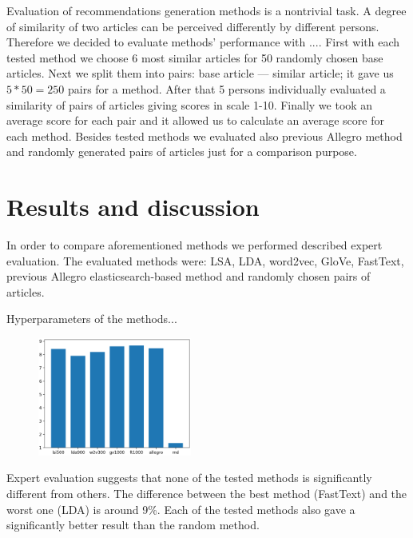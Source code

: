\documentclass[twoside,twocolumn]{article}
\begin{document}
	Evaluation of recommendations generation methods is a nontrivial task. A degree of similarity of two articles can be perceived differently by different persons. Therefore we decided to evaluate methods' performance with .... First with each tested method we choose 6 most similar articles for 50 randomly chosen base articles. Next we split them into pairs: base article --- similar article; it gave us $5*50=250$ pairs for a method. After that 5 persons individually evaluated a similarity of pairs of articles giving scores in scale 1-10. Finally we took an average score for each pair and it allowed us to calculate an average score for each method. Besides tested methods we evaluated also previous Allegro method and randomly generated pairs of articles just for a comparison purpose.
	
	
	
	\section{Results and discussion}
	In order to compare aforementioned methods we performed described expert evaluation. The evaluated methods were: LSA, LDA, word2vec, GloVe, FastText, previous Allegro elasticsearch-based method and randomly chosen pairs of articles.
	
	Hyperparameters of the methods...

	\begin{figure}
		\centering
		\includegraphics[width=0.45\textwidth]{results.png}
		\caption{}
	\end{figure}
	
	Expert evaluation suggests that none of the tested methods is significantly different from others. The difference between the best method (FastText) and the worst one (LDA) is around 9\%. Each of the tested methods also gave a significantly better result than the random method.
	
\end{document}
